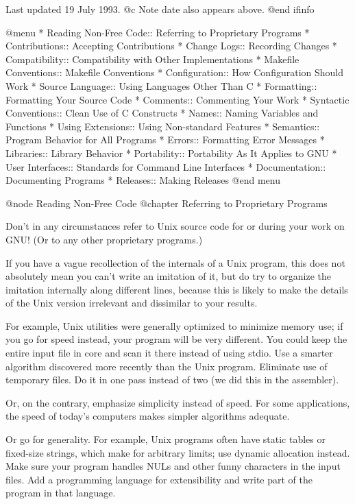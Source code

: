 Last updated 19 July 1993.
@c Note date also appears above.
@end ifinfo

@menu
* Reading Non-Free Code::	Referring to Proprietary Programs
* Contributions::		Accepting Contributions
* Change Logs::			Recording Changes
* Compatibility::		Compatibility with Other Implementations
* Makefile Conventions::	Makefile Conventions
* Configuration::		How Configuration Should Work
* Source Language::		Using Languages Other Than C
* Formatting::			Formatting Your Source Code
* Comments::			Commenting Your Work
* Syntactic Conventions::	Clean Use of C Constructs
* Names::			Naming Variables and Functions
* Using Extensions::		Using Non-standard Features
* Semantics::			Program Behavior for All Programs
* Errors::			Formatting Error Messages
* Libraries::			Library Behavior
* Portability::			Portability As It Applies to GNU
* User Interfaces::		Standards for Command Line Interfaces
* Documentation::		Documenting Programs
* Releases::			Making Releases
@end menu

@node Reading Non-Free Code
@chapter Referring to Proprietary Programs

Don't in any circumstances refer to Unix source code for or during
your work on GNU!  (Or to any other proprietary programs.)

If you have a vague recollection of the internals of a Unix program,
this does not absolutely mean you can't write an imitation of it, but
do try to organize the imitation internally along different lines,
because this is likely to make the details of the Unix version
irrelevant and dissimilar to your results.

For example, Unix utilities were generally optimized to minimize
memory use; if you go for speed instead, your program will be very
different.  You could keep the entire input file in core and scan it
there instead of using stdio.  Use a smarter algorithm discovered more
recently than the Unix program.  Eliminate use of temporary files.  Do
it in one pass instead of two (we did this in the assembler).

Or, on the contrary, emphasize simplicity instead of speed.  For some
applications, the speed of today's computers makes simpler algorithms
adequate.

Or go for generality.  For example, Unix programs often have static
tables or fixed-size strings, which make for arbitrary limits; use
dynamic allocation instead.  Make sure your program handles NULs and
other funny characters in the input files.  Add a programming language
for extensibility and write part of the program in that language.

